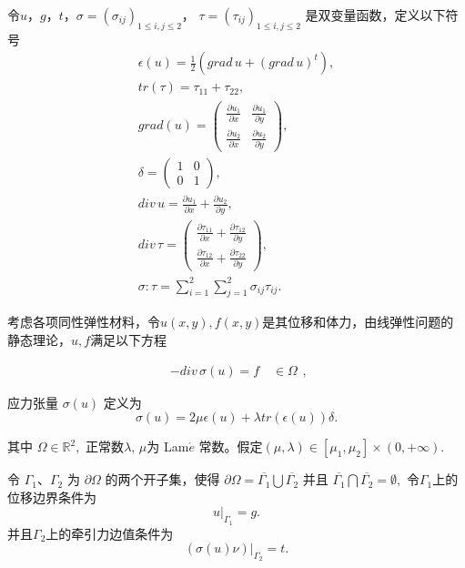 \documentclass[a4paper,UTF8,titlepage,10pt]{ctexart}
\numberwithin{equation}{subsection}
\begin{document}
令$u$，$g$，$t$，$\sigma=(\sigma_{ij})_{1 \le i,j \le 2}$， $\tau = (\tau_{ij})_{1\le i,j \le 2}$ 是双变量函数，定义以下符号
$$
\begin{matrix}
	\epsilon(u) = \frac{1}{2} (grad \, u + (grad \, u)^t) , \\
	tr(\tau) = \tau_{11} + \tau_{22} , \\
	grad(u) = \begin{pmatrix}
		\frac{\partial u_1}{\partial x} & \frac{\partial u_1}{\partial y} \\
		\frac{\partial u_2}{\partial x} &
		\frac{\partial u_2}{\partial y}
	\end{pmatrix} , \\
	\delta = \begin{pmatrix}
		1 & 0 \\
		0 & 1
	\end{pmatrix} , \\
	div \, u = \frac{\partial u_1}{\partial x} + \frac{\partial u_2}{\partial y} , \\
	div \, \tau = \begin{pmatrix}
		\frac{\partial \tau_{11}}{\partial x} + \frac{\partial \tau_{12}}{\partial y} \\
		\frac{\partial \tau_{12}}{\partial x} + \frac{\partial \tau_{22}}{\partial 
			y} 
	\end{pmatrix} , \\
	\sigma : \tau = \sum\limits_{i=1}^{2} \sum\limits_{j=1}^{2} \sigma_{ij} \tau_{ij} .
\end{matrix}
$$

考虑各项同性弹性材料，令$u(x,y),f(x,y)$是其位移和体力，由线弹性问题的静态理论，$u,f$满足以下方程

\begin{equation}
\begin{aligned}
	-div \, \sigma(u) = f \quad  \in \Omega 
\end{aligned}
\label{elasiticityEq} ,
\end{equation}

应力张量 $\sigma(u)$ 定义为
\begin{equation}
\sigma(u) = 2 \mu \epsilon(u) + \lambda tr(\epsilon(u)) \delta .
\end{equation}

其中 $\Omega \in \mathbb{R}^2,$ 正常数$\lambda, \, \mu$为 Lam$\acute{e}$ 常数。假定$(\mu, \lambda) \in [\mu_1,\mu_2] \times (0, +\infty).$

令 $\Gamma_1$、$\Gamma_2$ 为 $\partial \Omega$ 的两个开子集，使得 $\partial \Omega = \overline{\Gamma_1} \bigcup \overline{\Gamma_2}$ 并且 $\overline{\Gamma_1} \bigcap \overline{\Gamma_2} = \emptyset,$ 令$\Gamma_1$上的位移边界条件为
\begin{equation}
	u|_{\Gamma_1} = g .
\end{equation}
并且$\Gamma_2$上的牵引力边值条件为
\begin{equation}
	(\sigma(u) \nu) |_{\Gamma_2} = t .
\end{equation}
\end{document}
